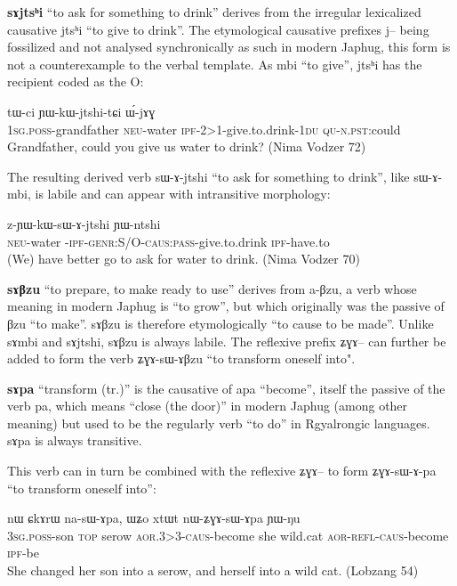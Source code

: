 \documentclass[oldfontcommands,oneside,a4paper,11pt]{memoir}
\newcommand{\ipa}[1]{{\phon #1}} %
\newcommand{\aor}{\textsc{aor}}
\newcommand{\caus}{\textsc{caus}}
\newcommand{\du}{\textsc{du}}
\newcommand{\genr}{\textsc{genr}}
\newcommand{\ipf}{\textsc{ipf}}
\newcommand{\neu}{\textsc{neu}}
\newcommand{\npst}{\textsc{n.pst}}
\newcommand{\pass}{\textsc{pass}}
\newcommand{\poss}{\textsc{poss}}
\newcommand{\qu}{\textsc{qu}}
\newcommand{\refl}{\textsc{refl}}
\newcommand{\sg}{\textsc{sg}}
\newcommand{\topic}{\textsc{top}}
\begin{document}
  
  
    \textbf{\ipa{sɤjtsʰi}} ``to ask for something to drink'' derives from the irregular lexicalized causative \ipa{jtsʰi} ``to give to drink''. The etymological causative prefixes \ipa{j}-- being fossilized and not analysed synchronically as such in modern Japhug, this form is not a counterexample to the verbal template. As \ipa{mbi} ``to give'', \ipa{jtsʰi} has the recipient coded as the O:
      \begin{exe}
\ex
\gll   \ipa{a-wɯ} 	\ipa{tɯ-ci} 	\ipa{ɲɯ-kɯ-jtshi-tɕi} 	\ipa{ɯ́-jɤɣ}  \\
1\sg{}.\poss{}-grandfather \neu{}-water \ipf{}-2>1-give.to.drink-1\du{} \qu{}-\npst{}:could \\
 \glt Grandfather, could you give us water to drink? (Nima Vodzer 72)
\end{exe}   
 The resulting derived verb \ipa{sɯ-ɤ-jtshi} ``to ask for something to drink'', like \ipa{sɯ-ɤ-mbi}, is labile and can appear with intransitive morphology:
    
    \begin{exe}
\ex
\gll   \ipa{tɯ-ci} 	\ipa{z-ɲɯ-kɯ-sɯ-ɤ-jtshi} 	\ipa{ɲɯ-ntshi}  \\
\neu{}-water \transl{}-\ipf{}-\genr{}:S/O-\caus{}:\pass{}-give.to.drink \ipf{}-have.to  \\
 \glt  (We) have better go to ask for water to drink.   (Nima Vodzer 70)
\end{exe} 
  
  \textbf{\ipa{sɤβzu}} ``to prepare, to make ready to use'' derives from \ipa{a-βzu}, a verb whose meaning in modern Japhug is ``to grow'', but which originally was the passive of \ipa{βzu} ``to make''. \ipa{sɤβzu}  is therefore etymologically ``to cause to be made''. Unlike   \ipa{sɤmbi} and \ipa{sɤjtshi}, \ipa{sɤβzu} is always labile. The reflexive prefix \ipa{ʑɣɤ}-- can further be added to form the verb \ipa{ʑɣɤ-sɯ-ɤβzu} ``to transform oneself into".

  \textbf{\ipa{sɤpa}} ``transform (tr.)'' is the causative of \ipa{apa} ``become'', itself the passive of the verb \ipa{pa}, which means ``close (the door)'' in modern Japhug (among other meaning) but used to be the  regularly verb ``to do'' in Rgyalrongic languages. \ipa{sɤpa} is always transitive.
  
  This verb can in turn be combined with the reflexive \ipa{ʑɣɤ}-- to form \ipa{ʑɣɤ-sɯ-ɤ-pa} ``to transform oneself into'':
  
  \begin{exe}
\ex
\gll \ipa{ɯ-tɕɯ} 	\ipa{nɯ} 	\ipa{ɕkɤrɯ} 	\ipa{na-sɯ-ɤpa,} 	\ipa{ɯʑo} 	\ipa{xtɯt} 	\ipa{nɯ-ʑɣɤ-sɯ-ɤpa} 	\ipa{ɲɯ-ŋu} \\
3\sg{}.\poss{}-son \topic{} serow \aor{}.3>3-\caus{}-become she wild.cat \aor{}-\refl{}-\caus{}-become \ipf{}-be\\
 \glt She changed her son into a serow, and herself into a wild cat.  (Lobzang 54)
\end{exe} 
\end{document}
